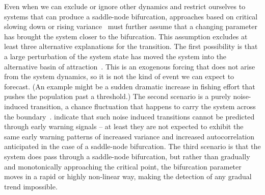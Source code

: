 \documentclass[authoryear,review,11pt]{elsarticle}
\begin{document}
Even when we can exclude or ignore other dynamics and
restrict ourselves to systems that can produce a saddle-node bifurcation,
approaches based on critical slowing down or rising variance~\citep[\emph{e.g.}][]{Held2004, Scheffer2009, Carpenter2011}
must further assume that a changing parameter has brought the system closer to the bifurcation.
This assumption excludes at least three alternative explanations for the transition.
The first possibility is that a large perturbation of the system state
has moved the system into the alternative basin of attraction~\citep{Scheffer2001, Scheffer2001}.
This is an exogenous forcing that does not arise from the system dynamics, so it is not the kind of event we can expect to forecast.
(An example might be a sudden dramatic increase in fishing effort that pushes the population past a threshold.)
The second scenario is a purely noise-induced transition, a chance fluctuation that happens to carry the system across the boundary~\citep{Ditlevsen2010}.
\citet{Livina2012} indicate that such noise induced transitions cannot be predicted through early warning signals -- 
at least they are not expected to exhibit the same early warning patterns of increased variance and increased autocorrelation
anticipated in the case of a saddle-node bifurcation.
The third scenario is that the system does pass through a saddle-node bifurcation,
but rather than gradually and monotonically approaching the critical point, the
bifurcation parameter moves in a rapid or highly non-linear way, making the detection of any gradual trend impossible.


\end{document}
